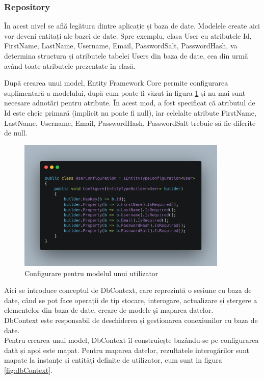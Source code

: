 \subsubsection{Repository}
În acest nivel se află legătura dintre aplicație și baza de date. Modelele create aici vor deveni entitați ale bazei de date.
Spre exemplu, clasa User cu atributele Id, FirstName, LastName, Username, Email, PasswordSalt, PasswordHash, va determina structura și atributele tabelei Users din baza de date, cea din urmă având toate atributele prezentate în clasă.

După crearea unui model, Entity Framework Core permite configurarea suplimentară a modelului, după cum poate fi văzut în figura \ref{fig:userEntityTypeConfiguration} și nu mai sunt necesare adnotări pentru atribute. În acest mod, a fost specificat că 
atributul de Id este cheie primară (implicit nu poate fi null), iar celelalte atribute FirstName, LastName, Username, Email, PasswordHash, PasswordSalt trebuie să fie diferite de null. 
\begin{figure}[H]
	\centering
	\includegraphics[width=100mm]{figs/userEntityTypeConfiguration.png}
	\caption{Configurare pentru modelul unui utilizator}
	\label{fig:userEntityTypeConfiguration}
\end{figure}

Aici se introduce conceptul de DbContext, care reprezintă o sesiune cu baza de date, când se pot face operații de tip stocare, interogare, actualizare și ștergere a elementelor din baza de date, creare de modele și maparea datelor.\\
DbContext este responsabil de deschiderea și gestionarea conexiunilor cu baza de date. \\
Pentru crearea unui model, DbContext îl construiește bazându-se pe configurarea dată și apoi este mapat. Pentru maparea datelor, rezultatele interogărilor sunt mapate la instanțe și entități definite de utilizator, cum sunt in figura \ref{fig:dbContext}.\\

